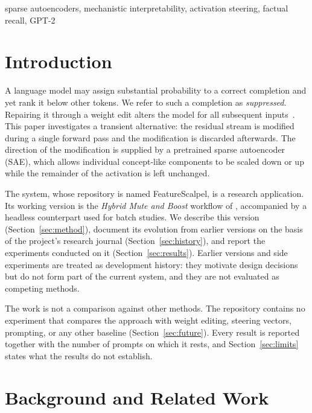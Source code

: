 \documentclass[conference]{IEEEtran}
\newcommand{\code}[1]{\texttt{\detokenize{#1}}}
\begin{document}
\begin{IEEEkeywords}
sparse autoencoders, mechanistic interpretability, activation steering, factual recall, GPT-2
\end{IEEEkeywords}

\section{Introduction}
A language model may assign substantial probability to a correct completion and yet rank it below other tokens. We refer to such a completion as \emph{suppressed}. Repairing it through a weight edit alters the model for all subsequent inputs~\cite{meng2022rome}. This paper investigates a transient alternative: the residual stream is modified during a single forward pass and the modification is discarded afterwards. The direction of the modification is supplied by a pretrained sparse autoencoder (SAE), which allows individual concept-like components to be scaled down or up while the remainder of the activation is left unchanged.

The system, whose repository is named FeatureScalpel, is a research application. Its working version is the \emph{Hybrid Mute and Boost} workflow of \code{experiment_app.py}, accompanied by a headless counterpart used for batch studies. We describe this version (Section~\ref{sec:method}), document its evolution from earlier versions on the basis of the project's research journal (Section~\ref{sec:history}), and report the experiments conducted on it (Section~\ref{sec:results}). Earlier versions and side experiments are treated as development history: they motivate design decisions but do not form part of the current system, and they are not evaluated as competing methods.

The work is not a comparison against other methods. The repository contains no experiment that compares the approach with weight editing, steering vectors, prompting, or any other baseline (Section~\ref{sec:future}). Every result is reported together with the number of prompts on which it rests, and Section~\ref{sec:limits} states what the results do not establish.

\section{Background and Related Work}
\end{document}
